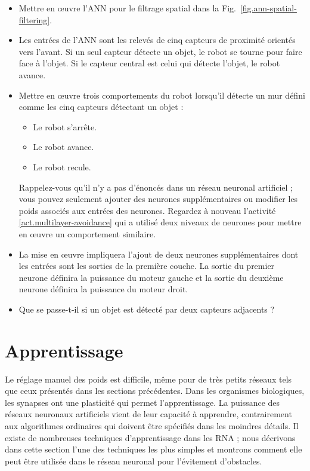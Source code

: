 \begin{framed}
\begin{itemize}
\item Mettre en œuvre l'ANN pour le filtrage spatial dans la Fig.~\ref{fig.ann-spatial-filtering}.
\item Les entrées de l'ANN sont les relevés de cinq capteurs de proximité orientés vers l'avant. Si un seul capteur détecte un objet, le robot se tourne pour faire face à l'objet. Si le capteur central est celui qui détecte l'objet, le robot avance. 
\item Mettre en œuvre trois comportements du robot lorsqu'il détecte un mur défini comme les cinq capteurs détectant un objet :
\begin{itemize}
\item Le robot s'arrête.
\item Le robot avance.
\item Le robot recule.
\end{itemize}
Rappelez-vous qu'il n'y a pas d'énoncés  dans un réseau neuronal artificiel ; vous pouvez seulement ajouter des neurones supplémentaires ou modifier les poids associés aux entrées des neurones. Regardez à nouveau l'activité \ref{act.multilayer-avoidance} qui a utilisé deux niveaux de neurones pour mettre en œuvre un comportement similaire.
\item La mise en œuvre impliquera l'ajout de deux neurones supplémentaires dont les entrées sont les sorties de la première couche. La sortie du premier neurone définira la puissance du moteur gauche et la sortie du deuxième neurone définira la puissance du moteur droit.
\item Que se passe-t-il si un objet est détecté par deux capteurs adjacents ?
\end{itemize}
\end{framed}

\section{Apprentissage}
\label{s.ann-learning}

Le réglage manuel des poids est difficile, même pour de très petits réseaux tels que ceux présentés dans les sections précédentes. Dans les organismes biologiques, les synapses ont une plasticité qui permet l'apprentissage. La puissance des réseaux neuronaux artificiels vient de leur capacité à apprendre, contrairement aux algorithmes ordinaires qui doivent être spécifiés dans les moindres détails. Il existe de nombreuses techniques d'apprentissage dans les RNA ; nous décrivons dans cette section l'une des techniques les plus simples et montrons comment elle peut être utilisée dans le réseau neuronal pour l'évitement d'obstacles.

